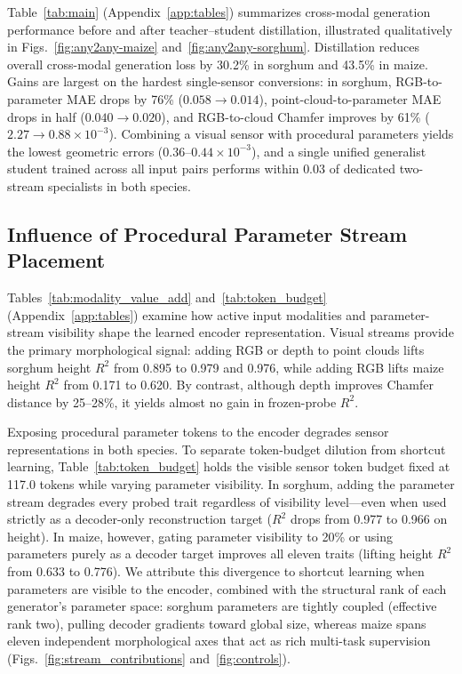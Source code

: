 \documentclass[10pt,twocolumn,letterpaper]{article}
\begin{document}
Table~\ref{tab:main} (Appendix~\ref{app:tables}) summarizes cross-modal generation performance before and after teacher--student distillation, illustrated qualitatively in Figs.~\ref{fig:any2any-maize} and~\ref{fig:any2any-sorghum}. Distillation reduces overall cross-modal generation loss by 30.2\% in sorghum and 43.5\% in maize. Gains are largest on the hardest single-sensor conversions: in sorghum, RGB-to-parameter MAE drops by 76\% ($0.058 \to 0.014$), point-cloud-to-parameter MAE drops in half ($0.040 \to 0.020$), and RGB-to-cloud Chamfer improves by 61\% ($2.27 \to 0.88 \times 10^{-3}$). Combining a visual sensor with procedural parameters yields the lowest geometric errors ($0.36\text{--}0.44 \times 10^{-3}$), and a single unified generalist student trained across all input pairs performs within $0.03$ of dedicated two-stream specialists in both species.

\subsection{Influence of Procedural Parameter Stream Placement}
\label{sec:param-stream}\label{sec:exp-params}

Tables~\ref{tab:modality_value_add} and~\ref{tab:token_budget} (Appendix~\ref{app:tables}) examine how active input modalities and parameter-stream visibility shape the learned encoder representation. Visual streams provide the primary morphological signal: adding RGB or depth to point clouds lifts sorghum height $R^2$ from 0.895 to 0.979 and 0.976, while adding RGB lifts maize height $R^2$ from 0.171 to 0.620. By contrast, although depth improves Chamfer distance by 25--28\%, it yields almost no gain in frozen-probe $R^2$.

Exposing procedural parameter tokens to the encoder degrades sensor representations in both species. To separate token-budget dilution from shortcut learning, Table~\ref{tab:token_budget} holds the visible sensor token budget fixed at 117.0 tokens while varying parameter visibility. In sorghum, adding the parameter stream degrades every probed trait regardless of visibility level---even when used strictly as a decoder-only reconstruction target ($R^2$ drops from 0.977 to 0.966 on height). In maize, however, gating parameter visibility to 20\% or using parameters purely as a decoder target improves all eleven traits (lifting height $R^2$ from 0.633 to 0.776). We attribute this divergence to shortcut learning when parameters are visible to the encoder, combined with the structural rank of each generator's parameter space: sorghum parameters are tightly coupled (effective rank two), pulling decoder gradients toward global size, whereas maize spans eleven independent morphological axes that act as rich multi-task supervision (Figs.~\ref{fig:stream_contributions} and~\ref{fig:controls}).
\end{document}
